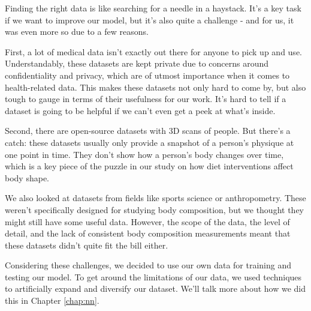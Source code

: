 Finding the right data is like searching for a needle in a haystack. It's a key
task if we want to improve our model, but it's also quite a challenge - and for
us, it was even more so due to a few reasons.

First, a lot of medical data isn't exactly out there for anyone to pick up and
use. Understandably, these datasets are kept private due to concerns around
confidentiality and privacy, which are of utmost importance when it comes to
health-related data. This makes these datasets not only hard to come by, but
also tough to gauge in terms of their usefulness for our work. It's hard to
tell if a dataset is going to be helpful if we can't even get a peek at what's
inside.

Second, there are open-source datasets with 3D scans of people. But there's a
catch: these datasets usually only provide a snapshot of a person's physique at
one point in time. They don't show how a person's body changes over time, which
is a key piece of the puzzle in our study on how diet interventions affect body
shape.

We also looked at datasets from fields like sports science or anthropometry.
These weren't specifically designed for studying body composition, but we
thought they might still have some useful data. However, the scope of the data,
the level of detail, and the lack of consistent body composition measurements
meant that these datasets didn't quite fit the bill either.

Considering these challenges, we decided to use our own data for training and
testing our model. To get around the limitations of our data, we used
techniques to artificially expand and diversify our dataset. We'll talk more
about how we did this in Chapter \ref{chap:nn}.